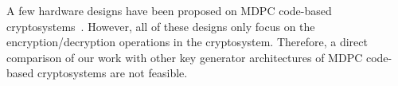 \documentclass[runningheads]{llncs}
\begin{document}


A few hardware designs have been proposed on MDPC code-based
cryptosystems~\cite{heyse2013smaller,von2014lightweight,hu2017area}.
However, all of these designs only focus on the encryption/decryption
operations in the cryptosystem.
Therefore, a direct comparison of our work
with other key generator architectures of MDPC code-based
cryptosystems are not feasible.
\end{document}
